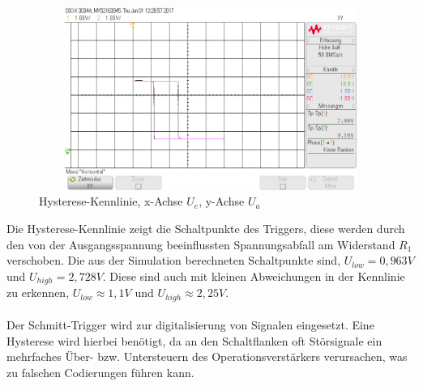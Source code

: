 \begin{figure}[H]
 \begin{center}
  \includegraphics[height=6cm,width=12cm]{OsziBilder/SchmittTrigger_XY}
 \end{center}
 \caption{Hysterese-Kennlinie, x-Achse $U_e$, y-Achse $U_a$}
\end{figure}
\noindent
Die Hysterese-Kennlinie zeigt die Schaltpunkte des Triggers, diese werden durch den von der 
Ausgangsspannung beeinflussten Spannungsabfall am Widerstand $R_1$ verschoben. Die aus der Simulation 
berechneten Schaltpunkte sind, $U_{low}=0,963V$ und $U_{high}=2,728V$. Diese sind auch mit kleinen
Abweichungen in der Kennlinie zu erkennen, $U_{low}\approx 1,1V$ und $U_{high}\approx 2,25V$.\\
\\
Der Schmitt-Trigger wird zur digitalisierung von Signalen eingesetzt. Eine Hysterese wird hierbei benötigt, 
da an den Schaltflanken oft Störsignale ein mehrfaches Über- bzw. Untersteuern des Operationsverstärkers verursachen, was
zu falschen Codierungen führen kann.

